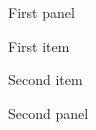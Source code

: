 \documentclass[prettycode,shellescape]{cheatsheet}
\begin{document}
\begin{multicols*}{4}

\begin{panel}{First panel}

    \itembox First item

    \itembox Second item

\end{panel}


\panelthemered


\begin{panel}{Second panel}

    \itembox

\end{panel}

\end{multicols*}
\end{document}
